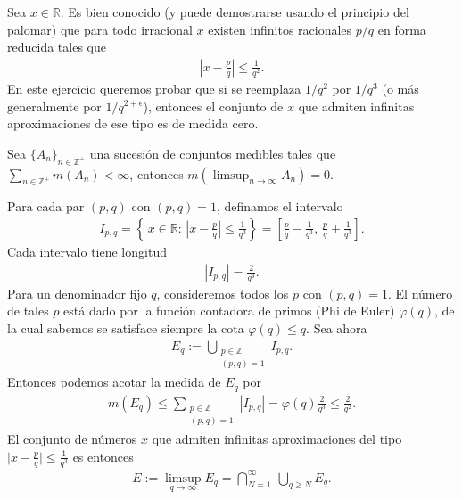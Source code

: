 \begin{homeworkProblem}
Sea $x\in\mathbb{R}$. Es bien conocido (y puede demostrarse usando el
principio del palomar) que para todo irracional $x$ existen infinitos
racionales $p/q$ en forma reducida tales que
\begin{align*}
  \left|x-\frac{p}{q}\right|\leq \frac{1}{q^{2}}. 
\end{align*}
En este ejercicio queremos probar que si se reemplaza $1/q^{2}$ por
$1/q^{3}$ (o más generalmente por $1/q^{2+\epsilon}$), entonces el
conjunto de $x$ que admiten infinitas aproximaciones de ese tipo es de
medida cero.
\end{homeworkProblem}
\begin{solucion}
  \begin{lema}
    Sea $\{A_{n}\}_{n\in\mathbb{Z}^{+}}$ una sucesión de conjuntos medibles tales que $\sum_{n\in\mathbb{Z}^{+}}m(A_{n})<\infty$, entonces $m(\limsup_{n\to\infty}A_{n})=0$.  
  \end{lema}
Para cada par $(p,q)$ con $(p,q)=1$, definamos el intervalo
\begin{align*}
  I_{p,q}=\left\{\,x\in\mathbb{R}:\,\left|x-\frac{p}{q}\right|\leq \frac{1}{q^{3}}\right\}=\left[\frac{p}{q}-\frac{1}{q^{3}},\, \frac{p}{q}+\frac{1}{q^{3}}\right].
\end{align*}
Cada intervalo tiene longitud
\begin{align*}
  |I_{p,q}|=\frac{2}{q^{3}}. 
\end{align*}
Para un denominador fijo $q$, consideremos todos los $p$ con $(p,q)=1$. El número de tales $p$ está dado por la función contadora de primos (Phi de Euler) $\varphi(q)$, de la cual sabemos se satisface siempre la cota $\varphi(q)\le q$.
Sea ahora
\begin{align*}
  E_q := \bigcup_{\substack{p\in\mathbb{Z}\\ (p,q)=1}} I_{p,q}. 
\end{align*}
Entonces podemos acotar la medida de $E_q$ por
\begin{align*}
  m(E_q)\leq \sum_{\substack{p\in\mathbb{Z}\\ (p,q)=1}} |I_{p,q}|= \varphi(q)\frac{2}{q^{3}} \leq \frac{2}{q^{2}}.
\end{align*}
El conjunto de números $x$ que admiten infinitas aproximaciones del tipo $\lvert x-\frac{p}{q}\rvert\leq \frac{1}{q^{3}}$ es entonces
\begin{align*}
  E := \limsup_{q\to\infty} E_q = \bigcap_{N=1}^{\infty}\ \bigcup_{q\ge N} E_q.
\end{align*}

\end{solucion}
